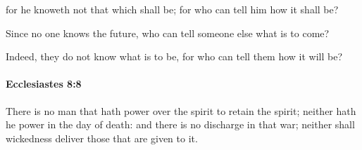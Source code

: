 			\begin{versebox}
					\item[BHS] 
					\item[LXX] 
					\item[ASV] for he knoweth not that which shall be; for who can tell him how it shall be?
					\item[NIV] Since no one knows the future, who can tell someone else what is to come?
					\item[NRSV] Indeed, they do not know what is to be, for who can tell them how it will be?
			\end{versebox}

		\paragraph{Ecclesiastes 8:8} %
			\label{ECCLESIASTES-8-8}

			There is no man that hath power over the spirit to retain the spirit; neither hath he power in the day of death: and there is no discharge in that war; neither shall wickedness deliver those that are given to it.

